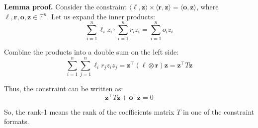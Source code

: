 \documentclass[../../book.tex]{subfiles}
\begin{document}
\textbf{Lemma proof.} Consider the constraint $\langle \boldsymbol{\ell},
\mathbf{z}\rangle \times \langle \boldsymbol{r}, \mathbf{z}\rangle = \langle
\boldsymbol{o}, \mathbf{z}\rangle$, where $\boldsymbol{\ell}, \boldsymbol{r}, \boldsymbol{o},
\mathbf{z} \in \mathbb{F}^n$. Let us expand the inner products: 
\[ \sum_{i=1}^{n} \ell_i z_i \cdot \sum_{i=1}^{n} r_i z_i = \sum_{i=1}^{n} o_i z_i \]

Combine the products into a double sum on the left side:
\[ \sum_{i=1}^{n} \sum_{j=1}^{n} \ell_i r_j z_i z_j = \mathbf{z}^{\top} (\boldsymbol{\ell} \otimes \boldsymbol{r}) \mathbf{z} = \mathbf{z}^{\top} T \mathbf{z} \]

Thus, the constraint can be written as:
\[ \mathbf{z}^{\top} T \mathbf{z} + \boldsymbol{o}^{\top} \mathbf{z} = 0 \]

So, the rank-1 means the rank of the coefficients matrix $T$ in one of the constraint formats.
\end{document}
